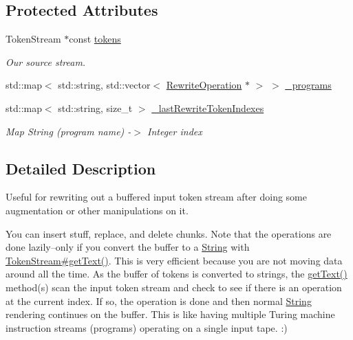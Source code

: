 \subsection*{Protected Attributes}
\begin{DoxyCompactItemize}
\item 
\mbox{\label{classantlr4_1_1TokenStreamRewriter_ac75597fb40771420ffa19c461b62da79}} 
Token\+Stream $\ast$const \hyperlink{classantlr4_1_1TokenStreamRewriter_ac75597fb40771420ffa19c461b62da79}{tokens}
\begin{DoxyCompactList}\small\item\em Our source stream. \end{DoxyCompactList}\item 
std\+::map$<$ std\+::string, std\+::vector$<$ \hyperlink{classantlr4_1_1TokenStreamRewriter_1_1RewriteOperation}{Rewrite\+Operation} $\ast$ $>$ $>$ \hyperlink{classantlr4_1_1TokenStreamRewriter_a6aebd86281a8c9878042e380217dd99a}{\+\_\+programs}
\item 
std\+::map$<$ std\+::string, size\+\_\+t $>$ \hyperlink{classantlr4_1_1TokenStreamRewriter_aef60d415092ce9574c23a83d34d4d1df}{\+\_\+last\+Rewrite\+Token\+Indexes}
\begin{DoxyCompactList}\small\item\em Map String (program name) -\/$>$ Integer index \end{DoxyCompactList}\end{DoxyCompactItemize}


\subsection{Detailed Description}
Useful for rewriting out a buffered input token stream after doing some augmentation or other manipulations on it.

You can insert stuff, replace, and delete chunks. Note that the operations are done lazily--only if you convert the buffer to a \hyperlink{}{String} with \hyperlink{}{Token\+Stream\#get\+Text()}. This is very efficient because you are not moving data around all the time. As the buffer of tokens is converted to strings, the \hyperlink{classantlr4_1_1TokenStreamRewriter_a4c8eb9cc4661e42941c90278caa6fd29}{get\+Text()} method(s) scan the input token stream and check to see if there is an operation at the current index. If so, the operation is done and then normal \hyperlink{}{String} rendering continues on the buffer. This is like having multiple Turing machine instruction streams (programs) operating on a single input tape. \+:)

